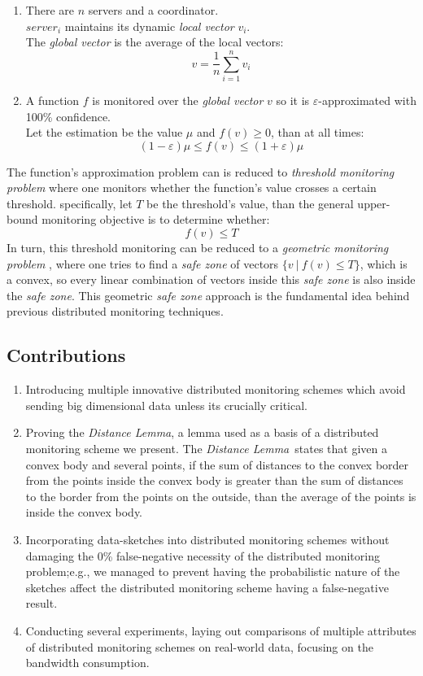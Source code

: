 \documentclass[10pt, conference]{IEEEtran}
\newcommand{\distanceLemma}{\textit{Distance Lemma}}
\begin{document}
\begin{enumerate}
\item There are $n$ servers and a coordinator. \\ $server_i$ maintains its dynamic \textit{local vector} $v_i$. \\ The \textit{global vector} is the average of the local vectors: $$v = \frac{1}{n}\sum\limits_{i=1}^n {v_i}$$
\item A function $f$ is monitored over the \textit{global vector} $v$ so it is $\varepsilon$-approximated with 100\% confidence. \\ Let the estimation  be the value $\mu$ and ${f(v) \geq 0}$, than at all times: $$(1-\varepsilon )\mu \leq f(v) \leq (1+\varepsilon )\mu $$
\end{enumerate}
The function's approximation problem can is reduced to \textit{threshold monitoring problem} \cite{garofalakis2013sketch} where one monitors whether the function's value crosses a certain threshold. specifically, let $T$ be the threshold's value, than the general upper-bound monitoring objective is to determine whether:
\begin{equation}
\label{functionMonitoringConstraint}
f(v) \leq T
\end{equation}
In turn, this threshold monitoring can be reduced to a \textit{geometric monitoring problem} \cite{sharfman2007geometric}, where one tries to find a \textit{safe zone} of vectors ${\{v \ | \ f(v) \leq T\}}$, which is a convex, so every linear combination of vectors inside this \textit{safe zone} is also inside the \textit{safe zone}. This geometric \textit{safe zone} approach is the fundamental idea behind previous distributed monitoring techniques.
\subsection{Contributions}
\begin{enumerate}
\item Introducing multiple innovative distributed monitoring schemes which avoid sending big dimensional data unless its crucially critical.
\item Proving the \distanceLemma , a lemma used as a basis of a distributed monitoring scheme we present. The \distanceLemma \ states that given a convex body and several points, if the sum of distances to the convex border from the points inside the convex body is greater than the sum of distances to the border from the points on the outside, than the average of the points is inside the convex body.
\item Incorporating data-sketches into distributed monitoring schemes without damaging the 0\% false-negative necessity of the distributed monitoring problem;e.g., we managed to prevent having the probabilistic nature of the sketches affect the distributed monitoring scheme having a false-negative result.
\item Conducting several experiments, laying out comparisons of multiple attributes of distributed monitoring schemes on real-world data, focusing on the bandwidth consumption.
\end{enumerate}
\end{document}
